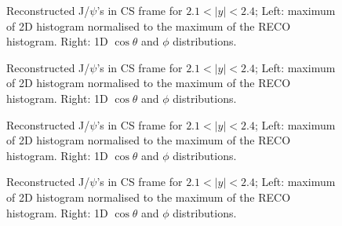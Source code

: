 \documentclass[12pt]{article}
\newcommand{\jpsi}{J/$\psi$}
\begin{document}
\begin{figure}[htbp]
\centering
{}
\caption{Reconstructed \jpsi's in CS frame for $2.1 < |y| < 2.4$; Left: maximum of 2D histogram normalised to the maximum of the RECO histogram. Right: 1D $\cos\theta$ and $\phi$ distributions.}
\label{fig:trackerMuonsVsEta}
\end{figure} \clearpage 

\begin{figure}[htbp]
\centering
{}
\caption{Reconstructed \jpsi's in CS frame for $2.1 < |y| < 2.4$; Left: maximum of 2D histogram normalised to the maximum of the RECO histogram. Right: 1D $\cos\theta$ and $\phi$ distributions.}
\label{fig:trackerMuonsVsEta}
\end{figure} \clearpage 

\begin{figure}[htbp]
\centering
{}
\caption{Reconstructed \jpsi's in CS frame for $2.1 < |y| < 2.4$; Left: maximum of 2D histogram normalised to the maximum of the RECO histogram. Right: 1D $\cos\theta$ and $\phi$ distributions.}
\label{fig:trackerMuonsVsEta}
\end{figure} \clearpage 

\begin{figure}[htbp]
\centering
{}
\caption{Reconstructed \jpsi's in CS frame for $2.1 < |y| < 2.4$; Left: maximum of 2D histogram normalised to the maximum of the RECO histogram. Right: 1D $\cos\theta$ and $\phi$ distributions.}
\label{fig:trackerMuonsVsEta}
\end{figure} \clearpage
\end{document}

